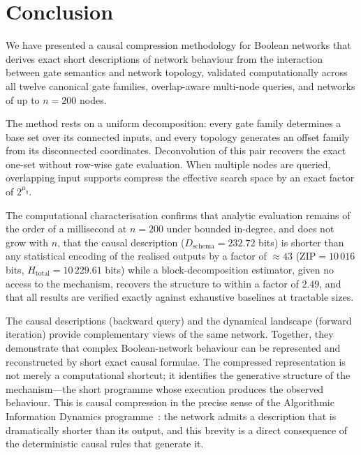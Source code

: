 \documentclass[11pt]{article}
\begin{document}
\section{Conclusion}\label{sec:conclusion}

We have presented a causal compression methodology for Boolean networks
that derives exact short descriptions of network behaviour from the
interaction between gate semantics and network topology, validated
computationally across all twelve canonical gate families, overlap-aware
multi-node queries, and networks of up to $n=200$ nodes.

The method rests on a uniform decomposition: every gate family determines a
base set over its connected inputs, and every topology generates an offset
family from its disconnected coordinates.  Deconvolution of this pair
recovers the exact one-set without row-wise gate evaluation.  When multiple
nodes are queried, overlapping input supports compress the effective search
space by an exact factor of $2^{\mu_q}$.

The computational characterisation confirms that analytic evaluation remains
of the order of a millisecond at $n=200$ under bounded in-degree, and
does not grow with $n$, that the causal
description ($D_{\mathrm{schema}}=232.72$ bits) is shorter than any statistical
encoding of the realised outputs by a factor of ${\approx}43$
($\mathrm{ZIP}=10\,016$ bits, $H_{\mathrm{total}}=10\,229.61$ bits) while a
block-decomposition estimator, given no access to the mechanism, recovers the
structure to within a factor of $2.49$, and that all results are verified
exactly against exhaustive baselines at tractable sizes.

The causal descriptions (backward query) and the dynamical landscape
(forward iteration) provide complementary views of the same network.
Together, they demonstrate that complex Boolean-network behaviour can be
represented and reconstructed by short exact causal formulae.  The
compressed representation is not merely a computational shortcut; it
identifies the generative structure of the mechanism---the short programme
whose execution produces the observed behaviour.  This is causal
compression in the precise sense of the Algorithmic Information Dynamics
programme~\cite{zenilcalculus}: the network admits a description that is
dramatically shorter than its output, and this brevity is a direct
consequence of the deterministic causal rules that generate it.
\end{document}
